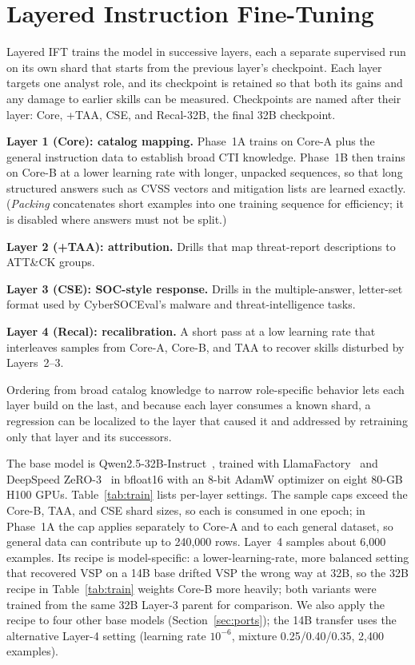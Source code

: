 \documentclass[conference]{IEEEtran}
\begin{document}
\section{Layered Instruction Fine-Tuning}\label{sec:layered}
Layered IFT trains the model in successive layers, each a separate supervised run on its own shard that starts from the previous layer's checkpoint. Each layer targets one analyst role, and its checkpoint is retained so that both its gains and any damage to earlier skills can be measured. Checkpoints are named after their layer: Core, +TAA, CSE, and Recal-32B, the final 32B checkpoint.

\textbf{Layer 1 (Core): catalog mapping.} Phase~1A trains on Core-A plus the general instruction data to establish broad CTI knowledge. Phase~1B then trains on Core-B at a lower learning rate with longer, unpacked sequences, so that long structured answers such as CVSS vectors and mitigation lists are learned exactly. (\emph{Packing} concatenates short examples into one training sequence for efficiency; it is disabled where answers must not be split.)

\textbf{Layer 2 (+TAA): attribution.} Drills that map threat-report descriptions to ATT\&CK groups.

\textbf{Layer 3 (CSE): SOC-style response.} Drills in the multiple-answer, letter-set format used by CyberSOCEval's malware and threat-intelligence tasks.

\textbf{Layer 4 (Recal): recalibration.} A short pass at a low learning rate that interleaves samples from Core-A, Core-B, and TAA to recover skills disturbed by Layers~2--3.

Ordering from broad catalog knowledge to narrow role-specific behavior lets each layer build on the last, and because each layer consumes a known shard, a regression can be localized to the layer that caused it and addressed by retraining only that layer and its successors.

The base model is Qwen2.5-32B-Instruct~\cite{qwen25}, trained with LlamaFactory~\cite{zheng2024llamafactory} and DeepSpeed ZeRO-3~\cite{rajbhandari2020zero} in bfloat16 with an 8-bit AdamW optimizer on eight 80-GB H100 GPUs. Table~\ref{tab:train} lists per-layer settings. The sample caps exceed the Core-B, TAA, and CSE shard sizes, so each is consumed in one epoch; in Phase~1A the cap applies separately to Core-A and to each general dataset, so general data can contribute up to 240,000 rows. Layer~4 samples about 6,000 examples. Its recipe is model-specific: a lower-learning-rate, more balanced setting that recovered VSP on a 14B base drifted VSP the wrong way at 32B, so the 32B recipe in Table~\ref{tab:train} weights Core-B more heavily; both variants were trained from the same 32B Layer-3 parent for comparison. We also apply the recipe to four other base models (Section~\ref{sec:ports}); the 14B transfer uses the alternative Layer-4 setting (learning rate $10^{-6}$, mixture 0.25/0.40/0.35, 2,400 examples).
\end{document}
